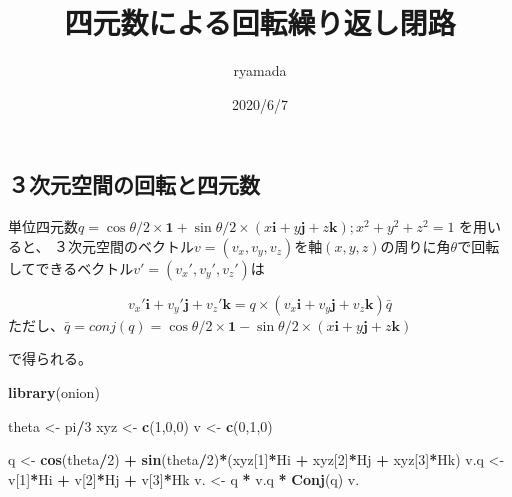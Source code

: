 \documentclass[]{article}
\title{四元数による回転繰り返し閉路}
\author{ryamada}
\date{2020/6/7}
\newenvironment{Shaded}{\begin{snugshade}}{\end{snugshade}}
\newcommand{\KeywordTok}[1]{\textcolor[rgb]{0.13,0.29,0.53}{\textbf{#1}}}
\newcommand{\DecValTok}[1]{\textcolor[rgb]{0.00,0.00,0.81}{#1}}
\newcommand{\StringTok}[1]{\textcolor[rgb]{0.31,0.60,0.02}{#1}}
\newcommand{\OperatorTok}[1]{\textcolor[rgb]{0.81,0.36,0.00}{\textbf{#1}}}
\newcommand{\NormalTok}[1]{#1}
\begin{document}
\maketitle

\subsection{３次元空間の回転と四元数}\label{ux6b21ux5143ux7a7aux9593ux306eux56deux8ee2ux3068ux56dbux5143ux6570}

単位四元数\(q = \cos{\theta/2} \times \mathbf{1} + \sin{\theta/2} \times (x \mathbf{i} + y \mathbf{j} + z \mathbf{k});x^2+y^2+z^2=1\)
を用いると、
３次元空間のベクトル\(v=(v_x,v_y,v_z)\)を軸\((x,y,z)\)の周りに角\(\theta\)で回転してできるベクトル\(v'=(v_x',v_y',v_z')\)は

\[
v_x' \mathbf{i} + v_y' \mathbf{j} + v_z' \mathbf{k} = q \times (v_x \mathbf{i} + v_y \mathbf{j} + v_z \mathbf{k}) \bar{q}
\]
ただし、\(\bar{q}=conj(q) = \cos{\theta/2} \times \mathbf{1} - \sin{\theta/2} \times (x \mathbf{i} + y \mathbf{j} + z \mathbf{k})\)

で得られる。

\begin{Shaded}
\begin{Highlighting}[]
\KeywordTok{library}\NormalTok{(onion)}
\end{Highlighting}
\end{Shaded}

\begin{Shaded}
\begin{Highlighting}[]
\NormalTok{theta <-}\StringTok{ }\NormalTok{pi}\OperatorTok{/}\DecValTok{3}
\NormalTok{xyz <-}\StringTok{ }\KeywordTok{c}\NormalTok{(}\DecValTok{1}\NormalTok{,}\DecValTok{0}\NormalTok{,}\DecValTok{0}\NormalTok{)}
\NormalTok{v <-}\StringTok{ }\KeywordTok{c}\NormalTok{(}\DecValTok{0}\NormalTok{,}\DecValTok{1}\NormalTok{,}\DecValTok{0}\NormalTok{)}

\NormalTok{q <-}\StringTok{ }\KeywordTok{cos}\NormalTok{(theta}\OperatorTok{/}\DecValTok{2}\NormalTok{) }\OperatorTok{+}\StringTok{ }\KeywordTok{sin}\NormalTok{(theta}\OperatorTok{/}\DecValTok{2}\NormalTok{)}\OperatorTok{*}\NormalTok{(xyz[}\DecValTok{1}\NormalTok{]}\OperatorTok{*}\NormalTok{Hi }\OperatorTok{+}\StringTok{ }\NormalTok{xyz[}\DecValTok{2}\NormalTok{]}\OperatorTok{*}\NormalTok{Hj }\OperatorTok{+}\StringTok{ }\NormalTok{xyz[}\DecValTok{3}\NormalTok{]}\OperatorTok{*}\NormalTok{Hk)}
\NormalTok{v.q <-}\StringTok{ }\NormalTok{v[}\DecValTok{1}\NormalTok{]}\OperatorTok{*}\NormalTok{Hi }\OperatorTok{+}\StringTok{ }\NormalTok{v[}\DecValTok{2}\NormalTok{]}\OperatorTok{*}\NormalTok{Hj }\OperatorTok{+}\StringTok{ }\NormalTok{v[}\DecValTok{3}\NormalTok{]}\OperatorTok{*}\NormalTok{Hk}
\NormalTok{v. <-}\StringTok{ }\NormalTok{q }\OperatorTok{*}\StringTok{ }\NormalTok{v.q }\OperatorTok{*}\StringTok{ }\KeywordTok{Conj}\NormalTok{(q)}
\NormalTok{v.}
\end{Highlighting}
\end{Shaded}
\end{document}
